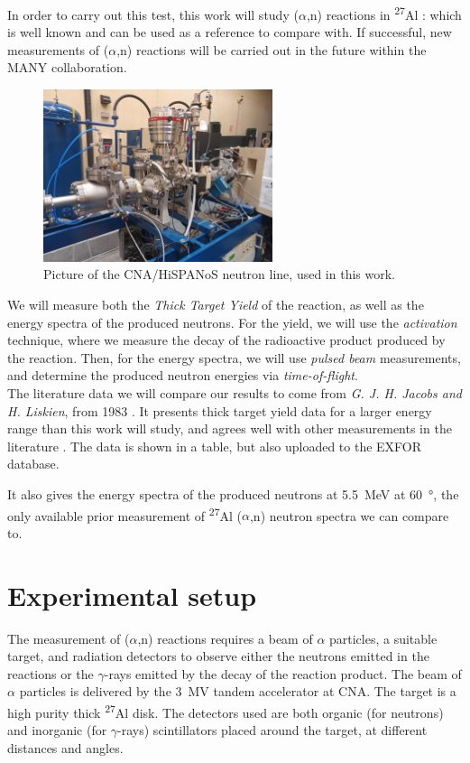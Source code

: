 \documentclass[a4paper,12pt]{report}
\newcommand{\an}{($\alpha$,n) }
\newcommand{\Aliso}{\textsuperscript{27}Al }
\begin{document}
In order to carry out this test, this work will study \an reactions in \Aliso: which is well known and can be used as a reference to compare with.
If successful, new measurements of \an reactions will be carried out in the future within the MANY collaboration.
\\

\begin{figure}[H]
	\centering
	\includegraphics[width=0.6\textwidth]{neutronline_foto.jpg}
	\caption{Picture of the CNA/HiSPANoS neutron line, used in this work.}
	\label{neutronline_foto}
\end{figure}

We will measure both the \textit{Thick Target Yield} of the reaction, as well as the energy spectra of the produced neutrons.
For the yield, we will use the \textit{activation} technique, where we measure the decay of the radioactive product produced by the reaction.
Then, for the energy spectra, we will use \textit{pulsed beam} measurements, and determine the produced neutron energies via \textit{time-of-flight}.
\\

The literature data we will compare our results to come from \textit{G. J. H. Jacobs and H. Liskien}, from 1983 \cite{jacobs}.
It presents thick target yield data for a larger energy range than this work will study, and agrees well with other measurements in the literature \cite{jacobssupport1, jacobssupport2}.
The data is shown in a table, but also uploaded to the EXFOR database.

It also gives the energy spectra of the produced neutrons at \qty{5.5}{\MeV} at \qty{60}{\degree}, the only available prior measurement of \Aliso\an neutron spectra we can compare to.


\chapter{Experimental setup}
The measurement of \an reactions requires a beam of $\alpha$ particles, a suitable target, and radiation detectors to observe either the neutrons emitted in the reactions or the $\gamma$-rays emitted by the decay of the reaction product.
The beam of $\alpha$ particles is delivered by the \qty{3}{\mega\volt} tandem accelerator at CNA.
The target is a high purity thick \Aliso disk.
The detectors used are both organic (for neutrons) and inorganic (for $\gamma$-rays) scintillators placed around the target, at different distances and angles.
\end{document}
